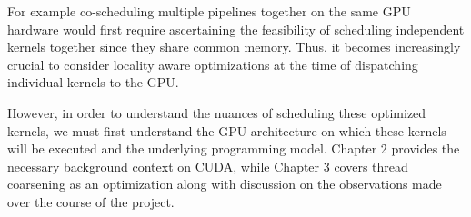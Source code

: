 	For example co-scheduling multiple pipelines together on the same GPU hardware would first require ascertaining the feasibility of scheduling independent kernels together since they share common memory. Thus, it becomes increasingly crucial to consider locality aware optimizations at the time of dispatching individual kernels to the GPU. 
	
	However, in order to understand the nuances of scheduling these optimized kernels, we must first understand the GPU architecture on which these kernels will be executed and the underlying programming model. Chapter 2 provides the necessary background context on CUDA, while Chapter 3 covers thread coarsening as an optimization along with discussion on the observations made over the course of the project.

   
